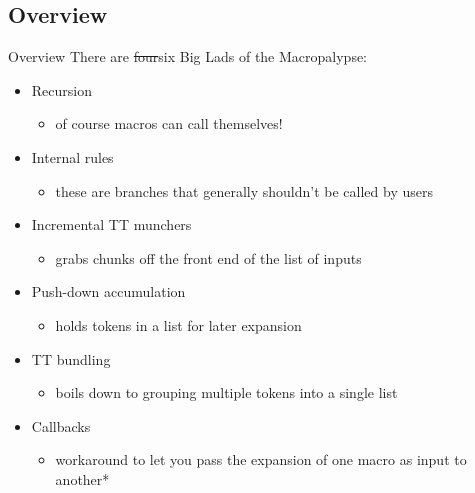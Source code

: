 \documentclass{beamer}
\begin{document}
	\subsection{Overview}
	\begin{frame}{Overview}
		There are \sout{four}six Big Lads of the Macropalypse:
		\begin{itemize}
			\item Recursion
			\begin{itemize}
				\item of course macros can call themselves!
			\end{itemize}

			\pause

			\item Internal rules
			\begin{itemize}
				\item these are branches that generally shouldn't be called by users\
			\end{itemize}

			\pause

			\item Incremental TT munchers
			\begin{itemize}
				\item grabs chunks off the front end of the list of inputs
			\end{itemize}

			\pause

			\item Push-down accumulation
			\begin{itemize}
				\item holds tokens in a list for later expansion
			\end{itemize}

			\pause

			\item TT bundling
			\begin{itemize}
				\item boils down to grouping multiple tokens into a single list
			\end{itemize}

			\pause

			\item Callbacks
			\begin{itemize}
				\item workaround to let you pass the expansion of one macro as input to another*
			\end{itemize}
		\end{itemize}
	\end{frame}
\end{document}
